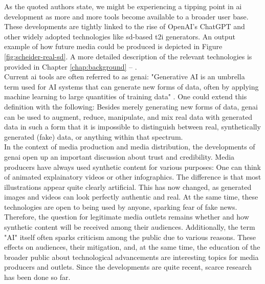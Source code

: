 \documentclass[
  a4paper,  %
  twoside,  %
  bibliography=totoc,
  headsepline,
  cleardoublepage=empty,
  parskip=half,
  draft=false
]{scrbook}
\begin{document}
As the quoted authors state, we might be experiencing a tipping point in \gls{ai} development as more and more tools become available to a broader user base. These developments are tightly linked to the rise of OpenAI's ChatGPT and other widely adopted technologies like \gls{sd}-based \gls{t2i} generators. An output example of how future media could be produced is depicted in Figure \ref{fig:scheider-real-sd}. A more detailed description of the relevant technologies is provided in Chapter \ref{chap:background} – . \\
Current \gls{ai} tools are often referred to as \gls{genai}: "Generative AI is an umbrella term used for AI systems that can generate new forms of data, often by applying machine learning to large quantities of training data" \cite{arguedasAutomatingDemocracyGenerative2023}. One could extend this definition with the following: Besides merely generating new forms of data, \gls{genai} can be used to augment, reduce, manipulate, and mix real data with generated data in such a form that it is impossible to distinguish between real, synthetically generated (fake) data, or anything within that spectrum. \\
In the context of media production and media distribution, the developments of \gls{genai} open up an important discussion about trust and credibility. Media producers have always used synthetic content for various purposes: One can think of animated explainatory videos or other infographics. The difference is that most illustrations appear quite clearly artificial. This has now changed, as generated images and videos can look perfectly authentic and real. At the same time, these technologies are open to being used by anyone, sparking fear of fake news. Therefore, the question for legitimate media outlets remains whether and how synthetic content will be received among their audiences. Additionally, the term "AI" itself often sparks criticism among the public due to various reasons. These effects on audiences, their mitigation, and, at the same time, the education of the broader public about technological advancements are interesting topics for media producers and outlets. Since the developments are quite recent, scarce research has been done so far.
\end{document}
